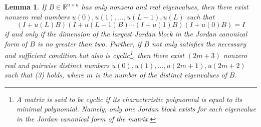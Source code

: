 \documentclass[journal,a4paper,12pt,onecolumn]{IEEEtran}
\newtheorem{lemma}[theorem]{Lemma}
\begin{document}
$\left. {}\right. $

\begin{lemma}
If $B\in
\mathbb{R}
^{n\times n}$ has only nonzero and real eigenvalues, then there exist
nonzero real numbers $u\left( 0\right) ,u\left( 1\right) ,\ldots ,u\left(
L-1\right) ,u\left( L\right) $ such that\begin{equation}
\left( I+u\left( L\right) B\right) \left( I+u\left( L-1\right) B\right)
\cdots \left( I+u\left( 1\right) B\right) \left( I+u\left( 0\right) B\right)
=I
\end{equation}if and only if the dimension of the largest Jordan block in the Jordan
canonical form of $B$ is no greater than two. Further, if $B$ not only
satisfies the necessary and sufficient condition but also is cyclic\footnote{A matrix is said to be cyclic if its characteristic polynomial is equal to
its minimal polynomial. Namely, only one Jordan block exists for each
eigenvalue in the Jordan canonical form of the matrix.}, then there exist $\left( 2m+3\right) $ nonzero real and pairwise distinct numbers $u\left(
0\right) ,u\left( 1\right) ,\ldots ,u\left( 2m+1\right) ,u\left( 2m+2\right)
$ such that (3) holds, where $m$ is the number of the distinct eigenvalues
of $B$.
\end{lemma}
\end{document}
